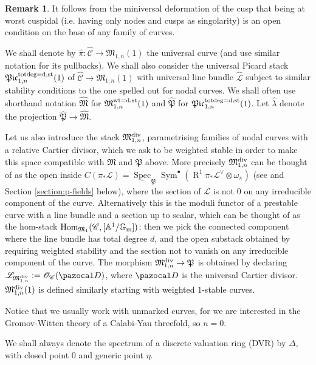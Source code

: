 \documentclass[11pt]{amsart}
\newcommand{\OO}{\mathcal O}
\renewcommand{\to}{\rightarrow}
\newcommand{\Aaff}{\mathbb A}
\newcommand{\cC}{\mathcal C}
\newcommand{\MM}{\mathfrak M}
\newcommand{\pP}{\mathfrak P}
\newcommand{\R}{\operatorname{R}}
\newcommand{\Gm}{\mathbb{G}_{\rm{m}}}
\newcommand{\PtoM}{\lambda}
\newcommand{\dvr}{\Delta}
\newcommand{\Spec}{\underline{\operatorname{Spec}}}
\newcommand{\Hom}{\operatorname{Hom}}
\theoremstyle{plain}
\theoremstyle{definition}
\newtheorem{remark}[thm]{Remark}
\begin{document}
\begin{remark}
 It follows from the miniversal deformation of the cusp that being at worst cuspidal (i.e. having only nodes and cusps as singolarity) is an open condition on the base of any family of curves.
\end{remark}
We shall denote by $\hat{\pi}\colon \widehat{\cC}\to \MM_{1,n}(1)$ the universal curve (and use similar notation for its pullbacks). We shall also consider the universal Picard stack $\mathfrak{Pic}^{\rm{tot deg}=d,\rm{st}}_{1,n}(1)$ of $\widehat{\cC}\to \mathfrak M_{1,n}(1)$ with universal line bundle $\widehat{\mathcal{L}}$ subject to similar stability conditions to the one spelled out for nodal curves. We shall often use shorthand notation $\widehat{\MM}$ for $\mathfrak M_{1,n}^{\rm{wt}=d,\rm{st}}(1)$ and $\widehat{\mathfrak P}$ for $\mathfrak{Pic}^{\rm{tot deg}=d,\rm{st}}_{1,n}(1)$. Let $\hat{\PtoM}$ denote the projection $\widehat{\mathfrak P}\to \widehat{\MM}$.

Let us also introduce the stack $\MM_{1,n}^{\rm{div}}$, parametrising families of nodal curves with a relative Cartier divisor, which we ask to be weighted stable in order to make this space compatible with $\MM$ and $\mathfrak P$ above. More precisely $\MM_{1,n}^{\rm{div}}$ can be thought of as the open inside $C(\pi_*\mathcal L)=\Spec_\pP\operatorname{Sym}^{\bullet}(\R^1\pi_*\mathcal L^{\vee}\otimes\omega_{\pi})$ (see \cite{CLpfields} and Section \ref{section:p-fields} below), where the section of $\mathcal L$ is not $0$ on any irreducible component of the curve. Alternatively this is the moduli functor of a prestable curve with a line bundle and a section up to scalar, which can be thought of as the hom-stack $\Hom_{\MM_1}(\cC,[\Aaff^1/\Gm])$; then we pick the connected component where the line bundle has total degree $d$, and the open substack obtained by requiring weighted stability and the section not to vanish on any irreducible component of the curve. The morphism $\MM_{1,n}^{\rm{div}}\to\mathfrak P$ is obtained by declaring $\mathcal L_{\MM_{1,n}^{\rm{div}}}:=\OO_{\cC}(\pazocal D)$, where $\pazocal D$ is the universal Cartier divisor. $\MM_{1,n}^{\rm{div}}(1)$ is defined similarly starting with weighted $1$-stable curves.

Notice that we usually work with unmarked curves, for we are interested in the Gromov-Witten theory of a Calabi-Yau threefold, so $n=0$.

We shall always denote the spectrum of a discrete valuation ring (DVR) by $\dvr$, with closed point $0$ and generic point $\eta$.
\end{document}
